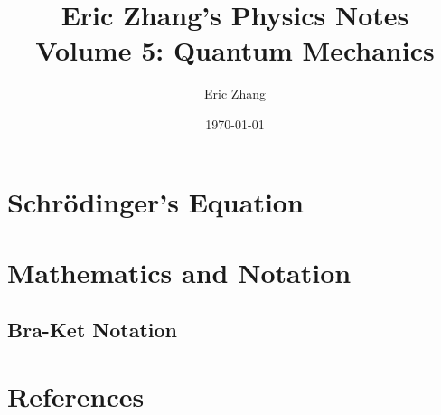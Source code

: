 \documentclass[a4paper, titlepage]{book}
\title{
    Eric Zhang's Physics Notes \\
    \large Volume 5: Quantum Mechanics
}
\author{Eric Zhang}
\date{\today}
\begin{document}
\frontmatter
\maketitle
\tableofcontents


\mainmatter\chapter{Schrödinger's Equation}


\appendix
\chapter{Mathematics and Notation}

\section{Bra-Ket Notation}


\backmatter
\chapter{References}
\end{document}
